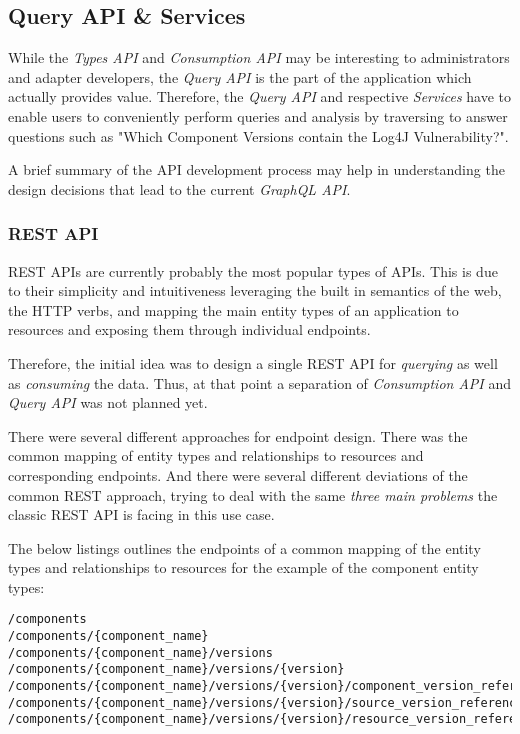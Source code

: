 \subsection{Query API \& Services} \label{sec:Query API & Services}
While the \emph{Types API} and \emph{Consumption API} may be interesting to administrators and adapter developers, the \emph{Query API} is the part of the application which actually provides value. Therefore, the \emph{Query API} and respective \emph{Services} have to enable users to conveniently perform queries and analysis by traversing to answer questions such as "Which Component Versions contain the Log4J Vulnerability?".\par
A brief summary of the API development process may help in understanding the design decisions that lead to the current \emph{GraphQL API}. 

\subsubsection{REST API}
REST APIs are currently probably the most popular types of APIs. This is due to their simplicity and intuitiveness leveraging the built in semantics of the web, the HTTP verbs, and mapping the main entity types of an application to resources and exposing them through individual endpoints.\par
Therefore, the initial idea was to design a single REST API for \emph{querying} as well as \emph{consuming} the data. Thus, at that point a separation of \emph{Consumption API} and \emph{Query API} was not planned yet.\par 
There were several different approaches for endpoint design. There was the common mapping of entity types and relationships to resources and corresponding endpoints. And there were several different deviations of the common REST approach, trying to deal with the same \emph{three main problems} the classic REST API is facing in this use case.\par 
The below listings outlines the endpoints of a common mapping of the entity types and relationships to resources for the example of the component entity types:

\begin{lstlisting}[basicstyle=\tiny, caption=REST API Endpoints, captionpos=b, label=lst:RESTAPIEndpoints]
/components
/components/{component_name}
/components/{component_name}/versions
/components/{component_name}/versions/{version}
/components/{component_name}/versions/{version}/component_version_references
/components/{component_name}/versions/{version}/source_version_references
/components/{component_name}/versions/{version}/resource_version_references
\end{lstlisting}

